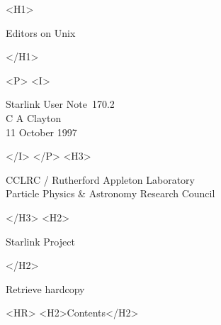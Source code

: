 \documentclass[twoside,11pt]{article}
\newcommand{\stardoccategory}  {Starlink User Note}
\newcommand{\stardocsource}    {sun\stardocnumber}
\newcommand{\stardocnumber}    {170.2}
\newcommand{\stardocauthors}   {C A Clayton}
\newcommand{\stardocdate}      {11 October 1997}
\newcommand{\stardoctitle}     {Editors on Unix}
\newcommand{\htmladdnormallink}[2]{#1}
\newcommand{\htmladdimg}[1]{}
\newcommand{\htmlref}[2]{#1}
\newcommand{\htmladdtonavigation}[1]{}
\newcommand{\xlabel}[1]{}
\begin{document}
\begin{htmlonly}
   \xlabel{}
   \begin{rawhtml} <H1> \end{rawhtml}
      \stardoctitle
   \begin{rawhtml} </H1> \end{rawhtml}


   \begin{rawhtml} <P> <I> \end{rawhtml}
   \stardoccategory\ \stardocnumber \\
   \stardocauthors \\
   \stardocdate
   \begin{rawhtml} </I> </P> <H3> \end{rawhtml}
      \htmladdnormallink{CCLRC}{http://www.cclrc.ac.uk} /
      \htmladdnormallink{Rutherford Appleton Laboratory}
                        {http://www.cclrc.ac.uk/ral} \\
      \htmladdnormallink{Particle Physics \& Astronomy Research Council}
                        {http://www.pparc.ac.uk} \\
   \begin{rawhtml} </H3> <H2> \end{rawhtml}
      \htmladdnormallink{Starlink Project}{http://www.starlink.ac.uk/}
   \begin{rawhtml} </H2> \end{rawhtml}
   \htmladdnormallink{\htmladdimg{source.gif} Retrieve hardcopy}
      {http://www.starlink.ac.uk/cgi-bin/hcserver?\stardocsource}\\

  \label{stardoccontents}
  \begin{rawhtml} 
    <HR>
    <H2>Contents</H2>
  \end{rawhtml}
  \htmladdtonavigation{\htmlref{\htmladdimg{contents_motif.gif}}
        {stardoccontents}}

\end{htmlonly}
\end{document}
